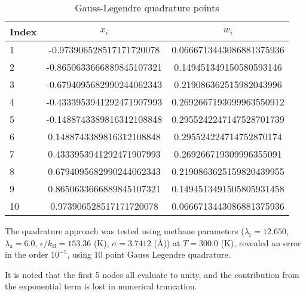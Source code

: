 \documentclass[english]{../thermomemo/thermomemo}
\newcommand{\lama}{\ensuremath{{\lambda_{\text{a}}}}\xspace}
\newcommand{\lamr}{\ensuremath{{\lambda_{\text{r}}}}\xspace}
\newcommand{\kB}{\ensuremath{k_{\text{B}}}\xspace}
\begin{document}
\begin{table}[htb]
  \center
  \begin{tabular}{lcc}
    \hline
    Index & $ x_i$ & $w_i$  \\
    \hline
    1 &	-0.973906528517171720078 &	0.0666713443086881375936 \\
    2 &	-0.8650633666889845107321 &	0.149451349150580593146 \\
    3 &	-0.6794095682990244062343 &	0.219086362515982043996 \\
    4 &	-0.4333953941292471907993 &	0.2692667193099963550912 \\
    5 &	-0.1488743389816312108848 &	0.2955242247147528701739 \\
    6 &	0.1488743389816312108848 &	0.295524224714752870174 \\
    7 &	0.4333953941292471907993 &	0.269266719309996355091 \\
    8 &	0.6794095682990244062343 &	0.2190863625159820439955 \\
    9 &	0.8650633666889845107321 &	0.1494513491505805931458 \\
    10 & 0.973906528517171720078 &	0.0666713443086881375936 \\
    \hline
  \end{tabular}
  \caption{Gauss-Legendre quadrature points}
\end{table}

The quadrature approach was tested using methane parameters
($\lamr = 12.650$, $\lama = 6.0$, $\epsilon/\kB = 153.36$ (K),
$\sigma = 3.7412$ (\AA)) at $T=300.0$ (K), revealed an error in the
order $10^{-5}$, using 10 point Gauss Legendre quadrature.

It is noted that the first 5 nodes all evaluate to unity, and the
contribution from the exponential term is lost in numerical
truncation.
\end{document}
